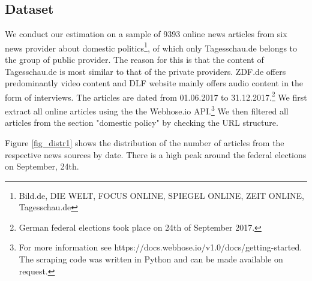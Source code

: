 \documentclass[12pt,a4paper,notitlepage]{article}
\begin{document}
\subsection{Dataset}\label{ch_data}

We conduct our estimation on a sample of 9393 online news articles from six news provider about domestic politics\footnote{Bild.de, DIE WELT, FOCUS ONLINE, SPIEGEL ONLINE, ZEIT ONLINE, Tagesschau.de}, of which only Tagesschau.de belongs to the group of public provider. The reason for this is that the content of Tagesschau.de is most similar to that of the private providers. ZDF.de offers predominantly video content and DLF website mainly offers audio content in the form of interviews. The articles are dated from 01.06.2017 to 31.12.2017.\footnote{German federal elections took place on 24th of September 2017.} We first extract all online articles using the the Webhose.io API.\footnote{For more information see https://docs.webhose.io/v1.0/docs/getting-started. The scraping code was written in Python and can be made available on request.} We then filtered all articles from the section "domestic policy" by checking the URL structure. 

Figure \ref{fig_distr1} shows the distribution of the number of articles from the respective news sources by date. There is a high peak around the federal elections on September, 24th.  
\end{document}
